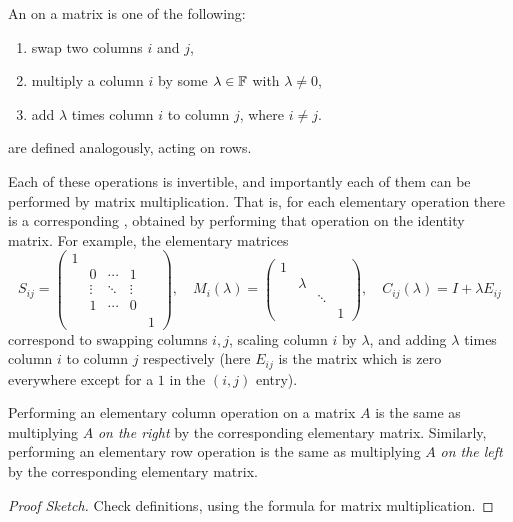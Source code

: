 \documentclass[a4paper]{scrartcl}
\begin{document}
\begin{definition}
    An  on a matrix is one of the following:
    \begin{enumerate}[label=(\roman*)]
        \item swap two columns $i$ and $j$,
        \item multiply a column $i$ by some $\lambda \in \mathbb{F}$ with $\lambda \neq 0$,
        \item add $\lambda$ times column $i$ to column $j$, where $i \neq j$.
    \end{enumerate}
     are defined analogously, acting on rows.
\end{definition}

Each of these operations is invertible, and importantly each of them can be performed by matrix multiplication. That is, for each elementary operation there is a corresponding , obtained by performing that operation on the identity matrix. For example, the elementary matrices
$$
S_{ij} = \begin{pmatrix}
    1 & & & & \\
    & 0 & \cdots & 1 & \\
    & \vdots & \ddots & \vdots & \\
    & 1 & \cdots & 0 & \\
    & & & & 1
\end{pmatrix}, \quad
M_{i}(\lambda) = \begin{pmatrix}
    1 & & & \\
    & \lambda & & \\
    & & \ddots & \\
    & & & 1
\end{pmatrix}, \quad
C_{ij}(\lambda) = I + \lambda E_{ij}
$$
correspond to swapping columns $i, j$, scaling column $i$ by $\lambda$, and adding $\lambda$ times column $i$ to column $j$ respectively (here $E_{ij}$ is the matrix which is zero everywhere except for a $1$ in the $(i, j)$ entry).

\begin{lemma}
    Performing an elementary column operation on a matrix $A$ is the same as multiplying $A$ \emph{on the right} by the corresponding elementary matrix. Similarly, performing an elementary row operation is the same as multiplying $A$ \emph{on the left} by the corresponding elementary matrix.
\end{lemma}
\begin{proof}[Proof Sketch]
    Check definitions, using the formula for matrix multiplication.
\end{proof}
\end{document}
